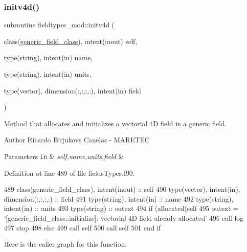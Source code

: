 \subsubsection{\texorpdfstring{initv4d()}{initv4d()}}
{\footnotesize\ttfamily subroutine fieldtypes\+\_\+mod\+::initv4d (\begin{DoxyParamCaption}\item[{class(\mbox{\hyperlink{structfieldtypes__mod_1_1generic__field__class}{generic\+\_\+field\+\_\+class}}), intent(inout)}]{self,  }\item[{type(string), intent(in)}]{name,  }\item[{type(string), intent(in)}]{units,  }\item[{type(vector), dimension(\+:,\+:,\+:,\+:), intent(in)}]{field }\end{DoxyParamCaption})\hspace{0.3cm}{\ttfamily [private]}}



Method that allocates and initializes a vectorial 4D field in a generic field. 

\begin{DoxyAuthor}{Author}
Ricardo Birjukovs Canelas -\/ M\+A\+R\+E\+T\+EC 
\end{DoxyAuthor}

\begin{DoxyParams}[1]{Parameters}
\mbox{\tt in}  & {\em self,name,units,field} & \\
\hline
\end{DoxyParams}


Definition at line 489 of file fields\+Types.\+f90.


\begin{DoxyCode}
489     \textcolor{keywordtype}{class}(generic\_field\_class), \textcolor{keywordtype}{intent(inout)} :: self
490     \textcolor{keywordtype}{type}(vector), \textcolor{keywordtype}{intent(in)}, \textcolor{keywordtype}{dimension(:,:,:,:)} :: field
491     \textcolor{keywordtype}{type}(string), \textcolor{keywordtype}{intent(in)} :: name
492     \textcolor{keywordtype}{type}(string), \textcolor{keywordtype}{intent(in)} :: units
493     \textcolor{keywordtype}{type}(string) :: outext
494     \textcolor{keywordflow}{if} (\textcolor{keyword}{allocated}(self%
495         outext = \textcolor{stringliteral}{'[generic\_field\_class::initialize]: vectorial 4D field already allocated'}
496         \textcolor{keyword}{call }log%
497         stop
498     \textcolor{keywordflow}{else}
499         \textcolor{keyword}{call }self%
500         \textcolor{keyword}{call }self%
501 \textcolor{keywordflow}{    end if}
\end{DoxyCode}
Here is the caller graph for this function\+:
\mbox{\label{namespacefieldtypes__mod_ac3e3d9aabba3893d61583e890e3bdf41}} 

